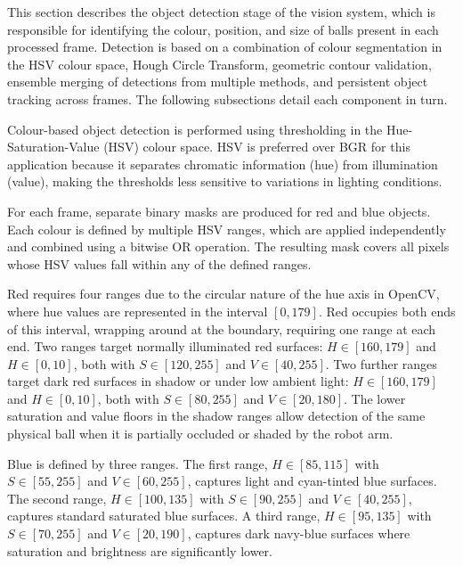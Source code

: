 \label{sec:object-detection}

This section describes the object detection stage of the vision system,
which is responsible for identifying the colour, position, and size of
balls present in each processed frame. Detection is based on a combination
of colour segmentation in the HSV colour space, Hough Circle Transform,
geometric contour validation, ensemble merging of detections from multiple
methods, and persistent object tracking across frames. The following
subsections detail each component in turn.


Colour-based object detection is performed using thresholding in the
Hue-Saturation-Value (HSV) colour space. HSV is preferred over BGR for this
application because it separates chromatic information (hue) from illumination
(value), making the thresholds less sensitive to variations in lighting conditions.

For each frame, separate binary masks are produced for red and blue objects. Each
colour is defined by multiple HSV ranges, which are applied independently and
combined using a bitwise OR operation. The resulting mask covers all pixels whose
HSV values fall within any of the defined ranges.

Red requires four ranges due to the circular nature of the hue axis in OpenCV,
where hue values are represented in the interval $[0, 179]$. Red occupies both
ends of this interval, wrapping around at the boundary, requiring one range at
each end. Two ranges target normally illuminated red surfaces:
$H \in [160, 179]$ and $H \in [0, 10]$, both with $S \in [120, 255]$ and
$V \in [40, 255]$. Two further ranges target dark red surfaces in shadow or under
low ambient light: $H \in [160, 179]$ and $H \in [0, 10]$, both with
$S \in [80, 255]$ and $V \in [20, 180]$. The lower saturation and value floors in
the shadow ranges allow detection of the same physical ball when it is partially
occluded or shaded by the robot arm.

Blue is defined by three ranges. The first range, $H \in [85, 115]$ with
$S \in [55, 255]$ and $V \in [60, 255]$, captures light and cyan-tinted blue
surfaces. The second range, $H \in [100, 135]$ with $S \in [90, 255]$ and
$V \in [40, 255]$, captures standard saturated blue surfaces. A third range,
$H \in [95, 135]$ with $S \in [70, 255]$ and $V \in [20, 190]$, captures dark
navy-blue surfaces where saturation and brightness are significantly lower.

